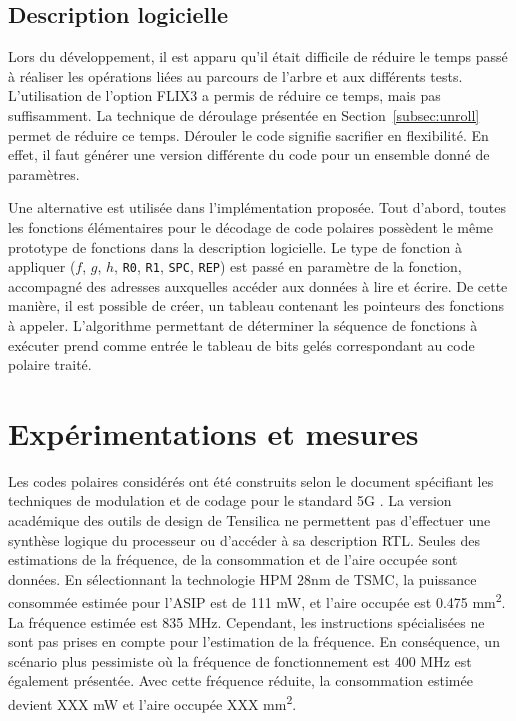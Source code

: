 \subsection{Description logicielle}
Lors du développement, il est apparu qu'il était difficile de réduire le temps passé à réaliser les opérations liées au parcours de l'arbre et aux différents tests. L'utilisation de l'option FLIX3 a permis de réduire ce temps, mais pas suffisamment. La technique de déroulage présentée en Section~\ref{subsec:unroll} permet de réduire ce temps. Dérouler le code signifie sacrifier en flexibilité. En effet, il faut générer une version différente du code pour un ensemble donné de paramètres.

Une alternative est utilisée dans l'implémentation proposée. Tout d'abord, toutes les fonctions élémentaires pour le décodage de code polaires possèdent le même prototype de fonctions dans la description logicielle. Le type de fonction à appliquer ($f$, $g$, $h$, \texttt{R0}, \texttt{R1}, \texttt{SPC}, \texttt{REP}) est passé en paramètre de la fonction, accompagné des adresses auxquelles accéder aux données à lire et écrire. De cette manière, il est possible de créer, un tableau contenant les pointeurs des fonctions à appeler. L'algorithme permettant de déterminer la séquence de fonctions à exécuter prend comme entrée le tableau de bits gelés correspondant au code polaire traité.

\section{Expérimentations et mesures}
\label{sec:tensilica_res}

Les codes polaires considérés ont été construits selon le document spécifiant les techniques de modulation et de codage pour le standard 5G \cite{}. 
La version académique des outils de design de Tensilica ne permettent pas d'effectuer une synthèse logique du processeur ou d'accéder à sa description RTL. Seules des estimations de la fréquence, de la consommation et de l'aire occupée sont données. En sélectionnant la technologie HPM 28nm de TSMC, la puissance consommée estimée pour l'ASIP est de 111 mW, et l'aire occupée est 0.475 mm\textsuperscript{2}. La fréquence estimée est 835 MHz. Cependant, les instructions spécialisées ne sont pas prises en compte pour l'estimation de la fréquence. En conséquence, un scénario plus pessimiste où la fréquence de fonctionnement est 400 MHz est également présentée. Avec cette fréquence réduite, la consommation estimée devient XXX mW et l'aire occupée XXX mm\textsuperscript{2}.
